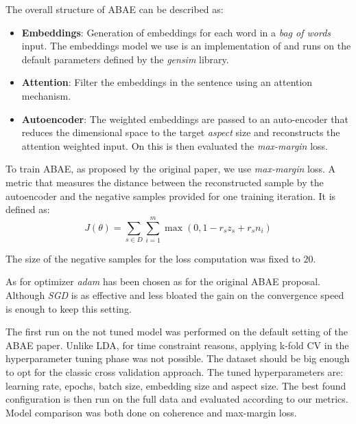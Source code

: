The overall structure of ABAE can be described as:
\begin{itemize}
    \item {\textbf{Embeddings}}: Generation of embeddings for each word in a \textit{bag of words} input.
    The embeddings model we use is an implementation of  and runs on the default parameters defined by the \textit{gensim} library.
    \item {\textbf{Attention}}: Filter the embeddings in the sentence using an attention mechanism.
    \item {\textbf{Autoencoder}}: The weighted embeddings are passed to an auto-encoder that reduces the dimensional
    space to the target \textit{aspect} size and reconstructs the attention weighted input.
    On this is then evaluated the \textit{max-margin} loss.
\end{itemize}

To train ABAE, as proposed by the original paper, we use \textit{max-margin} loss.
A metric that measures the distance between the reconstructed sample by the autoencoder and the negative samples
provided for one training iteration.
It is defined as:
$$ J(\theta) = \sum_{s\in D}\sum_{i=1}^m \max(0, 1 - r_sz_s + r_sn_i)$$

The size of the negative samples for the loss computation was fixed to $20$.

As for optimizer \textit{adam} has been chosen as for the original ABAE proposal.
Although \textit{SGD} is as effective and less bloated\cite{wilson2018marginal} the gain on
the convergence speed is enough to keep this setting.

The first run on the not tuned model was performed on the default setting of the ABAE paper.
Unlike LDA, for time constraint reasons, applying k-fold CV in the hyperparameter tuning phase was not possible.
The dataset should be big enough to opt for the classic cross validation approach.
The tuned hyperparameters are: learning rate, epochs, batch size, embedding size and aspect size.
The best found configuration is then run on the full data and evaluated according to our metrics.
Model comparison was both done on coherence and max-margin loss.